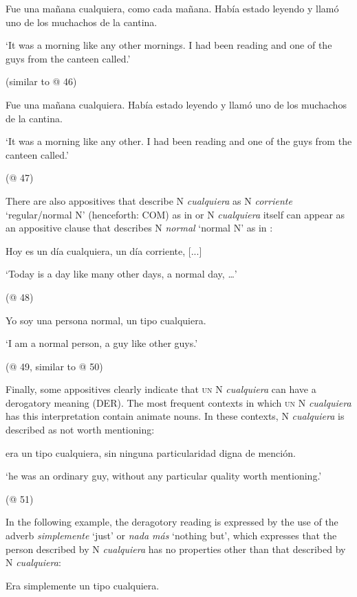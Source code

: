 \label{bkm:Ref42870625}  Fue una mañana cualquiera, como cada mañana. Había estado leyendo y llamó uno de los muchachos de la cantina.

  ‘It was a morning like any other mornings. I had been reading and one of the guys from the canteen called.’

  (similar to @ 46)

\label{bkm:Ref42870616}  Fue una mañana cualquiera. Había estado leyendo y llamó uno de los muchachos de la cantina.

  ‘It was a morning like any other. I had been reading and one of the guys from the canteen called.’

  (@ 47)

There are also appositives that describe N \textit{cualquiera} as N \textit{corriente} ‘regular/normal N’ (henceforth: COM) as in  or N \textit{cualquiera} itself can appear as an appositive clause that describes N \textit{normal} ‘normal N’ as in :

\label{bkm:Ref57554115}  Hoy es un día cualquiera, un día corriente, [...]

  ‘Today is a day like many other days, a normal day, …’

  (@ 48)

\label{bkm:Ref63545479}  Yo soy una persona normal, un tipo cualquiera.

  ‘I am a normal person, a guy like other guys.’

  (@ 49, similar to @ 50)

Finally, some appositives clearly indicate that \textsc{un} N \textit{cualquiera} can have a derogatory meaning (DER). The most frequent contexts in which \textsc{un} N \textit{cualquiera} has this interpretation contain animate nouns. In these contexts, N \textit{cualquiera} is described as not worth mentioning:

  era un tipo cualquiera, sin ninguna particularidad digna de mención.

  ‘he was an ordinary guy, without any particular quality worth mentioning.’

  (@ 51)

In the following example, the deragotory reading is expressed by the use of the adverb \textit{simplemente} ‘just’ or \textit{nada más} ‘nothing but’, which expresses that the person described by N \textit{cualquiera} has no properties other than that described by N \textit{cualquiera}:

  Era simplemente un tipo cualquiera.

